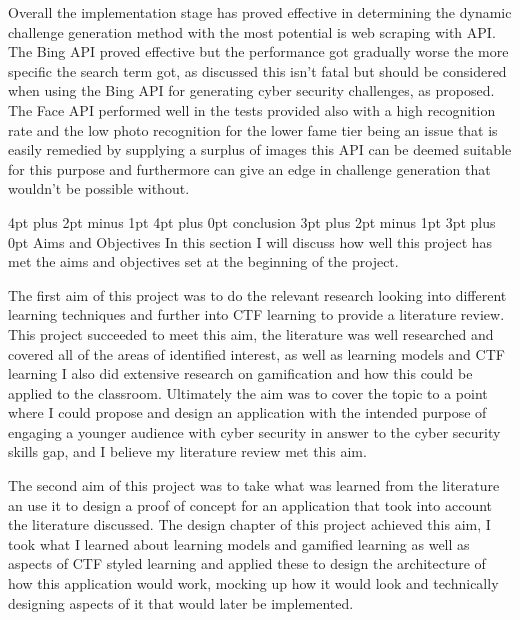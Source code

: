\documentclass[12pt,a4paper]{article}
\makeatletter
\renewcommand\subsection{\@startsection {subsection}{1}{2mm} %
                               {3pt plus 2pt minus 1pt} %
                               {3pt plus 0pt} %
                               {\normalfont\bfseries}}
\renewcommand\section{\@startsection {section}{1}{0mm} %
                               {4pt plus 2pt minus 1pt} %
                               {4pt plus 0pt} %
                               {\bfseries}}
\makeatother
\begin{document}
Overall the implementation stage has proved effective in determining the dynamic challenge generation method with the most potential is web scraping with API. The Bing API proved effective but the performance got gradually worse the more specific the search term got, as discussed this isn't fatal but should be considered when using the Bing API for generating cyber security challenges, as proposed. The Face API performed well in the tests provided also with a high recognition rate and the low photo recognition for the lower fame tier being an issue that is easily remedied by supplying a surplus of images this API can be deemed suitable for this purpose and furthermore can give an edge in challenge generation that wouldn't be possible without.

\section{conclusion} 
\subsection{Aims and Objectives}  
In this section I will discuss how well this project has met the aims and objectives set at the beginning of the project.  

The first aim of this project was to do the relevant research looking into different learning techniques and further into CTF learning to provide a literature review. This project succeeded to meet this aim, the literature was well researched and covered all of the areas of identified interest, as well as learning models and CTF learning I also did extensive research on gamification and how this could be applied to the classroom. Ultimately the aim was to cover the topic to a point where I could propose and design an application with the intended purpose of engaging a younger audience with cyber security in answer to the cyber security skills gap, and I believe my literature review met this aim.   

The second aim of this project was to take what was learned from the literature an use it to design a proof of concept for an application that took into account the literature discussed. The design chapter of this project achieved this aim, I took what I learned about learning models and gamified learning as well as aspects of CTF styled learning and applied these to design the architecture of how this application would work, mocking up how it would look and technically designing aspects of it that would later be implemented. 
\end{document}
